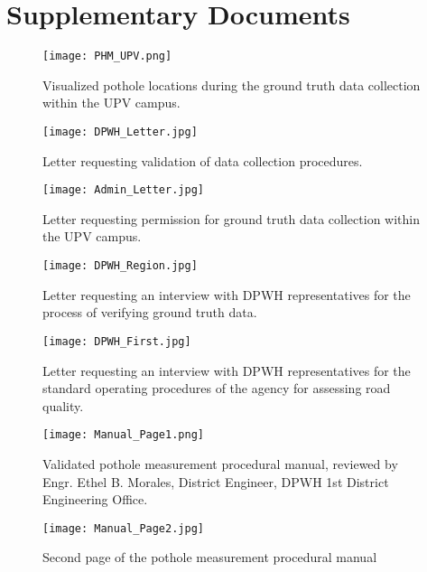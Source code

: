 \chapter{Supplementary Documents}
\label{sec:appendixd}

\begin{figure}[htbp]
	\centering
	\texttt{[image: PHM\_UPV.png]}
	\caption{Visualized pothole locations during the ground truth data collection within the UPV campus.}
	\label{fig:pothole_map}
\end{figure}

\begin{figure}[htbp]
	\centering
	\texttt{[image: DPWH\_Letter.jpg]}
	\caption{Letter requesting validation of data collection procedures.}
	\label{fig:validation_letter}
\end{figure}

\begin{figure}[htbp]
	\centering
	\texttt{[image: Admin\_Letter.jpg]}
	\caption{Letter requesting permission for ground truth data collection within the UPV campus.}
	\label{fig:permission_letter}
\end{figure}

\begin{figure}[htbp]
	\centering
	\texttt{[image: DPWH\_Region.jpg]}
	\caption{Letter requesting an interview with DPWH representatives for the process of verifying ground truth data.}
	\label{fig:regional_letter}
\end{figure}

\begin{figure}[htbp]
	\centering
	\texttt{[image: DPWH\_First.jpg]}
	\caption{Letter requesting an interview with DPWH representatives for the standard operating procedures of the agency for assessing road quality.}
	\label{fig:interview_letter}
\end{figure}

\begin{figure}[htbp]
	\centering
	\texttt{[image: Manual\_Page1.png]}
	\caption{Validated pothole measurement procedural manual, reviewed by Engr. Ethel B. Morales, District Engineer, DPWH 1st District Engineering Office.}
	\label{fig:manual_page1}
\end{figure}

\begin{figure}[htbp]
	\centering
	\texttt{[image: Manual\_Page2.jpg]}
	\caption{Second page of the pothole measurement procedural manual}
	\label{fig:manual_page2}
\end{figure}


